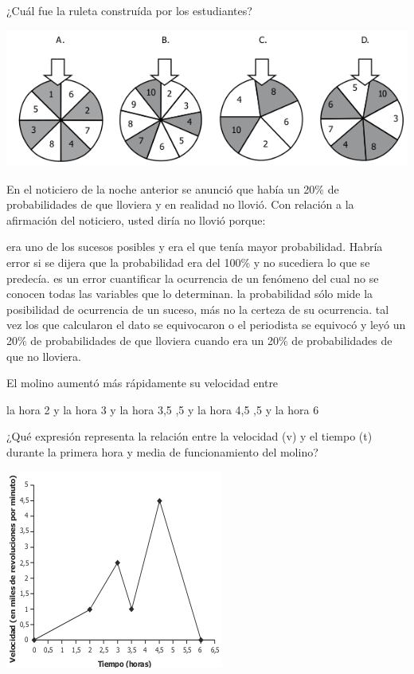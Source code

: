 \documentclass[10pt,letterpaper,addpoints]{exam}
\begin{document}
\begin{questions}
¿Cuál fue la ruleta construída por los estudiantes?
\begin{center}
\includegraphics[scale=.65]{Images/ruletas.png}
\end{center}
\question En el noticiero de la noche anterior se anunció que había un 20\% de probabilidades de que lloviera y en realidad no llovió. Con relación a la afirmación del noticiero, usted diría no llovió porque:
\begin{choices}
\choice era uno de los sucesos posibles y era el que tenía mayor probabilidad. Habría error si se dijera que la probabilidad era del 100\% y no sucediera lo que se predecía.
\choice es un error cuantificar la ocurrencia de un fenómeno del cual no se conocen todas las variables que lo determinan.
\CorrectChoice la probabilidad sólo mide la posibilidad de ocurrencia de un suceso, más no la certeza de su ocurrencia.
\choice tal vez los que calcularon el dato se equivocaron o el periodista se equivocó y leyó un 20\% de probabilidades de que lloviera cuando era un 20\% de probabilidades de que no lloviera.
\end{choices}
\begin{minipage}{.45\textwidth}
\question El molino aumentó más rápidamente su velocidad entre
\begin{choices}
\choice la hora 2 y la hora 3
 y la hora 3,5
,5 y la hora 4,5
,5 y la hora 6
\end{choices}
\question ¿Qué expresión representa la relación entre la velocidad (v) y el tiempo (t) durante la
primera hora y media de funcionamiento del molino?
\end{minipage}\hfill
\begin{minipage}{.5\textwidth}
\includegraphics[scale=.7]{Images/velocida_molino.png} 
\end{minipage}


\end{questions}
\end{document}
